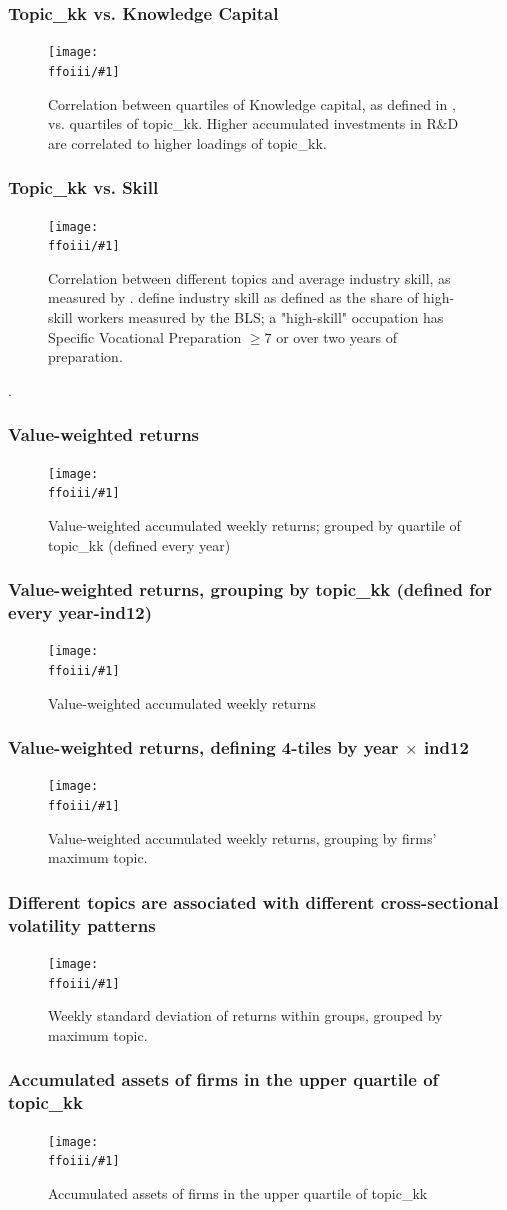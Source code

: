 \documentclass{beamer}
\newcommand{\ffoiii}{dicfullmc10thr10defnob5noa0_8_3t}
\newcommand{\insertfigureiii}[2]{
\begin{figure}[h!]
  \centering
  \texttt{[image: \\ffoiii/\#1]}
  \centering
  \captionsetup{font=scriptsize}
  \caption{#2}
  \label{fig:#1}
\end{figure}
}
\begin{document}
\begin{frame}
\frametitle{Topic\_kk vs. Knowledge Capital}
\scriptsize
\insertfigureiii{topicvskkpt_hm}{Correlation between quartiles of Knowledge capital,  as defined in \cite{Peters2017-fl}, vs. quartiles of topic\_kk. Higher accumulated investments in R\&D are correlated to higher loadings of topic\_kk.}
\end{frame}

\begin{frame}
\frametitle{Topic\_kk vs. Skill}
\scriptsize
\insertfigureiii{heatmap}{Correlation between different topics and average industry skill, as measured by \cite{Belo2017-qi}. \cite{Belo2017-qi} define industry skill as defined as the share of high-skill workers measured by the BLS; a "high-skill" occupation has Specific Vocational Preparation $\geq 7$ or over two years of preparation.}. 
\end{frame}

\begin{frame}
\frametitle{Value-weighted returns}

\insertfigureiii{awawr}{Value-weighted accumulated weekly returns; grouped by quartile of topic\_kk (defined every year)}
\end{frame}



\begin{frame}
\frametitle{Value-weighted returns, grouping by topic\_kk (defined for every year-ind12)}
\insertfigureiii{awawr_aggind}{Value-weighted accumulated weekly returns}
\end{frame}

\begin{frame}
\frametitle{Value-weighted returns, defining 4-tiles by year $\times$ ind12}
\insertfigureiii{awawr_byg}{Value-weighted accumulated weekly returns, grouping by firms' maximum topic.}
\end{frame}

\begin{frame}
\frametitle{Different topics are associated with different cross-sectional volatility patterns}
\insertfigureiii{wsdr_byg}{Weekly standard deviation of returns within groups, grouped by maximum topic.}
\end{frame}

\begin{frame}
\frametitle{Accumulated assets of firms in the upper quartile of topic\_kk}
\insertfigureiii{stackedplot_at}{Accumulated assets of firms in the upper quartile of topic\_kk}
\end{frame}
\end{document}
